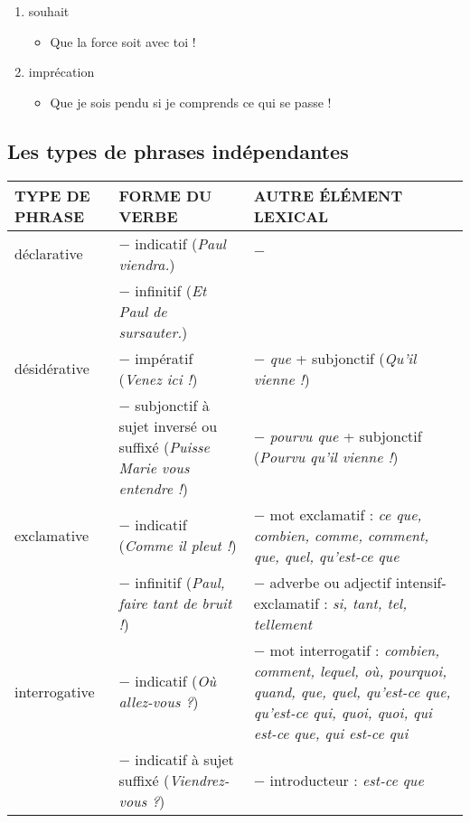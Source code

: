 \documentclass[UTF8]{report}
\begin{document}
\begin{enumerate}
\begin{enumerate}
\begin{enumerate}
\begin{itemize}
            \end{itemize}
            \item souhait
            \begin{itemize}
                \item Que la force soit avec toi !
            \end{itemize}
            \item imprécation
            \begin{itemize}
                \item Que je sois pendu si je comprends ce qui se passe !
            \end{itemize}
        \end{enumerate}
    \end{enumerate}
\end{enumerate}

\subsection{Les types de phrases indépendantes}
\begin{table}[H]
\centering
\begin{tabular}{|l|p{}|p{}|}
\hline
\rowcolor{cyan!20}
\textbf{TYPE DE PHRASE} & \textbf{FORME DU VERBE} & \textbf{AUTRE ÉLÉMENT LEXICAL} \\
\hline
déclarative & $-$ indicatif (\textit{Paul viendra.}) & $-$ \\
& $-$ infinitif (\textit{Et Paul de sursauter.}) & \\
\hline
désidérative & $-$ impératif (\textit{Venez ici !}) & $-$ \textit{que} + subjonctif (\textit{Qu'il vienne !}) \\
& $-$ subjonctif à sujet inversé ou suffixé (\textit{Puisse Marie vous entendre !}) & $-$ \textit{pourvu que} + subjonctif (\textit{Pourvu qu'il vienne !}) \\
\hline
exclamative & $-$ indicatif (\textit{Comme il pleut !}) & $-$ mot exclamatif : \textit{ce que, combien, comme, comment, que, quel, qu'est-ce que} \\
& $-$ infinitif (\textit{Paul, faire tant de bruit !})
& $-$ adverbe ou adjectif intensif-exclamatif : \textit{si, tant, tel, tellement} \\
\hline
interrogative & $-$ indicatif (\textit{Où allez-vous ?}) & $-$ mot interrogatif : \textit{combien, comment, lequel, où, pourquoi, quand, que, quel, qu'est-ce que, qu'est-ce qui, quoi, quoi, qui est-ce que, qui est-ce qui} \\
& $-$ indicatif à sujet suffixé (\textit{Viendrez-vous ?})
& $-$ introducteur : \textit{est-ce que} \\
\hline
\end{tabular}
\end{table}
\end{document}
